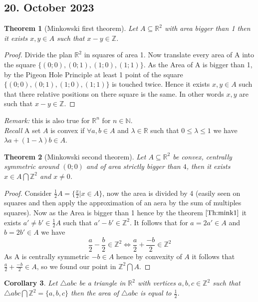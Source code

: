 \documentclass[a4paper,11pt,american]{article}
\newcommand{\N}{\mathbb{N}}
\newcommand{\R}{\mathbb{R}}
\newcommand{\Z}{\mathbb{Z}}
\theoremstyle{plain}
\newtheorem{theorem}{Theorem}
\newtheorem{corollary}[theorem]{Corollary}
\theoremstyle{definition}
\begin{document}
\subsection*{20. October 2023}
\begin{theorem}[Minkowski first theorem]\label{Th:mink1}
    Let $A\subseteq\R^2$ with area bigger than 1 then it exists $x,y\in A$ such that $x-y\in \Z$.
\end{theorem}
\begin{proof}
    Divide the plan $\R^2$ in squares of area 1. Now translate every area of A into the square $\{(0;0), (0;1), (1;0),(1;1)\}$. As the Area of A is bigger than 1, by the Pigeon Hole Principle at least 1 point of the square $\{(0;0), (0;1), (1;0),(1;1)\}$ is touched twice. Hence it exists $x,y\in A$ such that there relative positions on there square is the same. In other words $x,y$ are such that $x-y\in \Z$.
\end{proof}
\emph{Remark:} this is also true for $\R^n$ for $n\in \N$.\\
\emph{Recall} A set $A$ is convex if $\forall a,b\in A$ and $\lambda\in \R$ such that $0\leq \lambda\leq1$ we have $\lambda a+(1-\lambda)b\in A$.
\begin{theorem}[Minkowski second theorem]\label{th:mink2}
    Let $A\subseteq \R^2$ be convex, centrally symmetric around $(0;0)$ and of area strictly bigger than $4$, then it exists $x\in A\bigcap \Z^2$ and $x\neq 0$.
\end{theorem}
\begin{proof}
    Consider $\frac{1}{2}A=\{\frac{x}{2}\vert x\in A\}$, now the area is divided by 4 (easily seen on squares and then apply the approximation of an aera by the sum of multiples squares). Now as the Area is bigger than 1 hence by the theorem $\eqref{Th:mink1}$ it exists $a'\neq b'\in \frac{1}{2}A$ such that $a'-b'\in\Z^2$. It follows that for $a=2a'\in A$ and $b=2b'\in A$ we have $$\frac{a}{2}-\frac{b}{2}\in \Z^2\iff \frac{a}{2}+\frac{-b}{2}\in \Z^2 $$ 
    As A is centrally symmetric $-b\in A$ hence by convexity of $A$ it follows that $\frac{a}{2}+\frac{-b}{2}\in A$, so we found our point in $\Z^2\bigcap A$.
\end{proof}
\begin{corollary} \label{cor Mink}
    Let $\bigtriangleup abc$ be a triangle in $\R^2$ with vertices $a,b,c\in \Z^2$ such that $\bigtriangleup abc\bigcap\Z^2=\{a,b,c\}$ then the area of $\bigtriangleup abc$ is equal to $\frac{1}{2}$.
\end{corollary}
\end{document}
